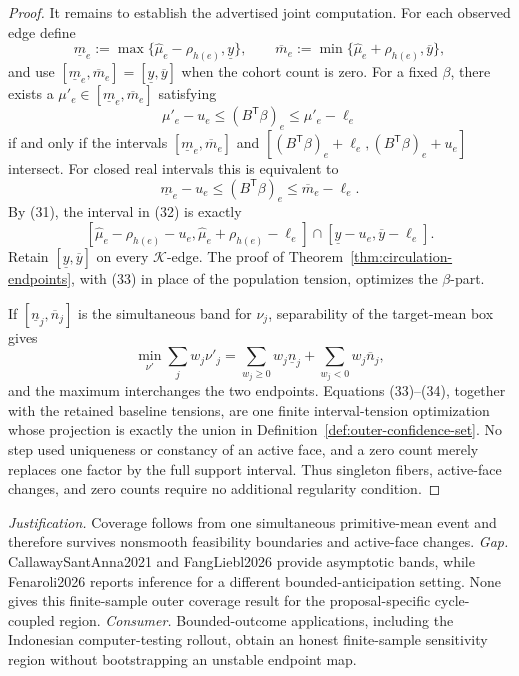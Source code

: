 \documentclass{article}
\begin{document}
\begin{proof}
It remains to establish the advertised joint computation.  For each observed edge define
\[
 \underline m_e:=\max\{\widehat\mu_e-\rho_{h(e)},\underline y\},
 \qquad
 \overline m_e:=\min\{\widehat\mu_e+\rho_{h(e)},\overline y\},
\tag{31}
\]
and use \([\underline m_e,\overline m_e]=[\underline y,\overline y]\) when the cohort count is zero.  For a fixed \(\beta\), there exists a \(\mu'_e\in[\underline m_e,\overline m_e]\) satisfying
\[
 \mu'_e-u_e\le(B^{\mathsf T}\beta)_e\le\mu'_e-\ell_e
\]
if and only if the intervals \([\underline m_e,\overline m_e]\) and \([(B^{\mathsf T}\beta)_e+\ell_e,(B^{\mathsf T}\beta)_e+u_e]\) intersect.  For closed real intervals this is equivalent to
\[
 \underline m_e-u_e\le(B^{\mathsf T}\beta)_e
 \le\overline m_e-\ell_e.
\tag{32}
\]
By (31), the interval in (32) is exactly
\[
 [\widehat\mu_e-\rho_{h(e)}-u_e,
   \widehat\mu_e+\rho_{h(e)}-\ell_e]
 \cap[\underline y-u_e,\overline y-\ell_e].
\tag{33}
\]
Retain \([\underline y,\overline y]\) on every \(\mathcal K\)-edge.  The proof of Theorem~\ref{thm:circulation-endpoints}, with (33) in place of the population tension, optimizes the \(\beta\)-part.

If \([\underline n_j,\overline n_j]\) is the simultaneous band for \(\nu_j\), separability of the target-mean box gives
\[
 \min_{\nu'}\sum_jw_j\nu'_j
 =\sum_{w_j\ge0}w_j\underline n_j
  +\sum_{w_j<0}w_j\overline n_j,
\tag{34}
\]
and the maximum interchanges the two endpoints.  Equations (33)--(34), together with the retained baseline tensions, are one finite interval-tension optimization whose projection is exactly the union in Definition~\ref{def:outer-confidence-set}.  No step used uniqueness or constancy of an active face, and a zero count merely replaces one factor by the full support interval.  Thus singleton fibers, active-face changes, and zero counts require no additional regularity condition.
\end{proof}
\par\smallskip\noindent \textit{Justification.} Coverage follows from one simultaneous primitive-mean event and therefore survives nonsmooth feasibility boundaries and active-face changes. \textit{Gap.} CallawaySantAnna2021 and FangLiebl2026 provide asymptotic bands, while Fenaroli2026 reports inference for a different bounded-anticipation setting. None gives this finite-sample outer coverage result for the proposal-specific cycle-coupled region. \textit{Consumer.} Bounded-outcome applications, including the Indonesian computer-testing rollout, obtain an honest finite-sample sensitivity region without bootstrapping an unstable endpoint map.
\end{document}

